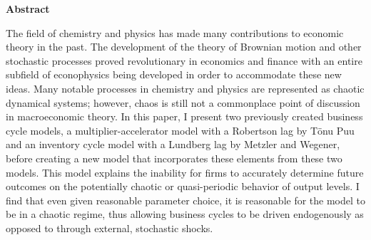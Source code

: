 \thispagestyle{plain}
\begin{center}
	\vspace*{\fill}
	\textbf{Abstract}\\
\end{center}
	The field of chemistry and physics has made many contributions to economic theory in the past. The development of the theory of Brownian motion and other stochastic processes proved revolutionary in economics and finance with an entire subfield of econophysics being developed in order to accommodate these new ideas. Many notable processes in chemistry and physics are represented as chaotic dynamical systems; however, chaos is still not a commonplace point of discussion in macroeconomic theory. In this paper, I present two previously created business cycle models, a multiplier-accelerator model with a Robertson lag by T\"onu Puu and an inventory cycle model with a Lundberg lag by Metzler and Wegener, before creating a new model that incorporates these elements from these two models. This model explains the inability for firms to accurately determine future outcomes on the potentially chaotic or quasi-periodic behavior of output levels. I find that even given reasonable parameter choice, it is reasonable for the model to be in a chaotic regime, thus allowing business cycles to be driven endogenously as opposed to through external, stochastic shocks.
	\vspace*{\fill}
\pagebreak